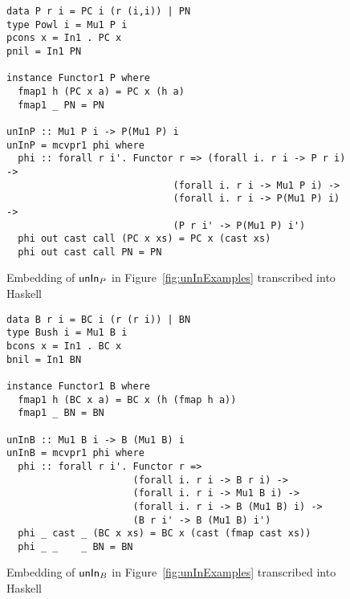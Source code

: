 \begin{figure}
\begin{singlespace}
\begin{lstlisting}
data P r i = PC i (r (i,i)) | PN
type Powl i = Mu1 P i
pcons x = In1 . PC x
pnil = In1 PN

instance Functor1 P where
  fmap1 h (PC x a) = PC x (h a)
  fmap1 _ PN = PN

unInP :: Mu1 P i -> P(Mu1 P) i
unInP = mcvpr1 phi where
  phi :: forall r i'. Functor r => (forall i. r i -> P r i) ->
                             (forall i. r i -> Mu1 P i) ->
                             (forall i. r i -> P(Mu1 P) i) ->
                             (P r i' -> P(Mu1 P) i')
  phi out cast call (PC x xs) = PC x (cast xs)
  phi out cast call PN = PN
\end{lstlisting}
\end{singlespace}
\caption{Embedding of $\mathsf{unIn}_P$ in Figure~\ref{fig:unInExamples}
	transcribed into Haskell}
\label{fig:HaskellunInP}
\end{figure}


\begin{figure}
\begin{singlespace}
\begin{lstlisting}
data B r i = BC i (r (r i)) | BN
type Bush i = Mu1 B i
bcons x = In1 . BC x
bnil = In1 BN

instance Functor1 B where
  fmap1 h (BC x a) = BC x (h (fmap h a))
  fmap1 _ BN = BN

unInB :: Mu1 B i -> B (Mu1 B) i
unInB = mcvpr1 phi where
  phi :: forall r i'. Functor r =>
                      (forall i. r i -> B r i) ->
                      (forall i. r i -> Mu1 B i) ->
                      (forall i. r i -> B (Mu1 B) i) ->
                      (B r i' -> B (Mu1 B) i')
  phi _ cast _ (BC x xs) = BC x (cast (fmap cast xs))
  phi _ _    _ BN = BN
\end{lstlisting}
\end{singlespace}
\caption{Embedding of $\mathsf{unIn}_B$ in Figure~\ref{fig:unInExamples}
	transcribed into Haskell}
\label{fig:HaskellunInB}
\end{figure}


